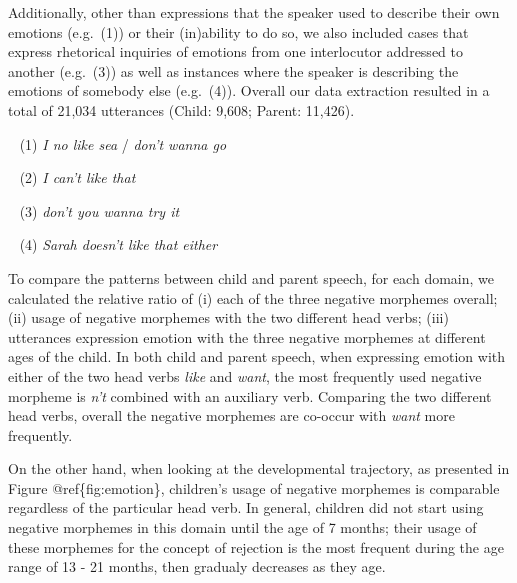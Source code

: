 \documentclass[10pt, letterpaper]{article}
\begin{document}
Additionally, other than expressions that the speaker used to describe
their own emotions (e.g.~(1)) or their (in)ability to do so, we also
included cases that express rhetorical inquiries of emotions from one
interlocutor addressed to another (e.g.~(3)) as well as instances where
the speaker is describing the emotions of somebody else (e.g.~(4)).
Overall our data extraction resulted in a total of 21,034 utterances
(Child: 9,608; Parent: 11,426).

~ (1) \emph{I no like sea} / \emph{don't wanna go}

~ (2) \emph{I can't like that}

~ (3) \emph{don't you wanna try it}

~ (4) \emph{Sarah doesn't like that either}

To compare the patterns between child and parent speech, for each
domain, we calculated the relative ratio of (i) each of the three
negative morphemes overall; (ii) usage of negative morphemes with the
two different head verbs; (iii) utterances expression emotion with the
three negative morphemes at different ages of the child. In both child
and parent speech, when expressing emotion with either of the two head
verbs \emph{like} and \emph{want}, the most frequently used negative
morpheme is \emph{n't} combined with an auxiliary verb. Comparing the
two different head verbs, overall the negative morphemes are co-occur
with \emph{want} more frequently.

On the other hand, when looking at the developmental trajectory, as
presented in Figure @ref\{fig:emotion\}, children's usage of negative
morphemes is comparable regardless of the particular head verb. In
general, children did not start using negative morphemes in this domain
until the age of 7 months; their usage of these morphemes for the
concept of rejection is the most frequent during the age range of 13 -
21 months, then gradualy decreases as they age.
\end{document}
